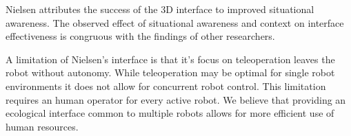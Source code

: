 Nielsen attributes the success of the 3D interface to improved situational awareness. The observed effect of situational awareness and context on interface effectiveness is congruous with the findings of other researchers. \cite{Nielsen_Teleoperation}

A limitation of Nielsen's interface is that it's focus on teleoperation leaves the robot without autonomy. While teleoperation may be optimal for single robot environments it does not allow for concurrent robot control. This limitation requires an human operator for every active robot. We believe that providing an ecological interface common to multiple robots allows for more efficient use of human resources.

